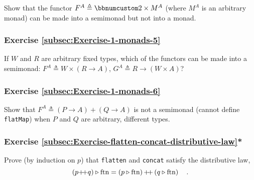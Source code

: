 Show that the functor $F^{A}\triangleq\bbnum 2\times M^{A}$ (where
$M^{A}$ is an arbitrary monad) can be made into a semimonad but not
into a monad.

\subsubsection{Exercise \label{subsec:Exercise-1-monads-5}\ref{subsec:Exercise-1-monads-5}}

If $W$ and $R$ are arbitrary fixed types, which of the functors
can be made into a semimonad: $F^{A}\triangleq W\times\left(R\rightarrow A\right)$,
$G^{A}\triangleq R\rightarrow\left(W\times A\right)$?

\subsubsection{Exercise \label{subsec:Exercise-1-monads-6}\ref{subsec:Exercise-1-monads-6}}

Show that $F^{A}\triangleq\left(P\rightarrow A\right)+\left(Q\rightarrow A\right)$
is not a semimonad (cannot define \lstinline!flatMap!) when $P$
and $Q$ are arbitrary, different types.

\subsubsection{Exercise \label{subsec:Exercise-flatten-concat-distributive-law}\ref{subsec:Exercise-flatten-concat-distributive-law}{*}}

Prove (by induction on $p$) that \lstinline!flatten! and \lstinline!concat!
satisfy the distributive law,
\[
\left(p{\displaystyle }{+\negmedspace+} q\right)\triangleright\text{ftn}=\left(p\triangleright\text{ftn}\right){\displaystyle }{+\negmedspace+}\left(q\triangleright\text{ftn}\right)\quad.
\]

\begin{comment}

\subparagraph{Solution}

The values $p$ and $q$ must have type $\text{List}^{\text{List}^{A}}$.
There are two possibilities: $p$ is an empty list ($p=1+\bbnum 0$),
and $p=\bbnum 0+h\times t$. If $p$ is empty, so is $p\triangleright\text{ftn}$
and the law holds. In the other case, we have (due to the code of
$\pplus$) that
\[
\left(\bbnum 0+h\times t\right)\pplus q=\bbnum 0+h\times\left(t\pplus q\right)\quad,
\]
and so
\begin{align*}
 & \left(p\pplus q\right)\triangleright\text{ftn}=\left(\bbnum 0+h\times\left(t\pplus q\right)\right)\triangleright\text{ftn}=h\pplus\gunderline{\left(t\pplus q\right)\triangleright\overline{\text{ftn}}}\\
{\color{greenunder}\text{inductive assumption}:}\quad & =\gunderline{h\pplus\left(t\triangleright\overline{\text{ftn}}\right)}\pplus\left(q\triangleright\overline{\text{ftn}}\right)\\
{\color{greenunder}\text{code of }\text{ftn}:}\quad & =\left(\bbnum 0+h\times t\right)\triangleright\overline{\text{ftn}}\pplus\left(q\triangleright\overline{\text{ftn}}\right)=\left(p\triangleright\text{ftn}\right)\pplus\left(q\triangleright\text{ftn}\right)\quad.
\end{align*}
\end{comment}


